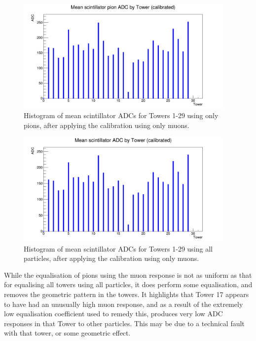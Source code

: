 \begin{figure}[h]
	\centering
	\includegraphics[width=0.95\textwidth]{../Pictures/IDEA/Calibration/towerplot-scintillator-mean-muoncalibrated-pions.png}
	\caption{Histogram of mean scintillator \acrshort{ADC}s for Towers 1-29 using only pions, after applying the calibration using only muons.}
	\label{figure:testbeam/results/towerplot-mean-muoncalibrated-pions}
\end{figure}

\begin{figure}[h]
	\centering
	\includegraphics[width=0.95\textwidth]{../Pictures/IDEA/Calibration/towerplot-scintillator-mean-muoncalibrated-all.png}
	\caption{Histogram of mean scintillator \acrshort{ADC}s for Towers 1-29 using all particles, after applying the calibration using only muons.}
	\label{figure:testbeam/results/towerplot-mean-muoncalibrated-all}
\end{figure}

While the equalisation of pions using the muon response is not as uniform as that for equalising all towers using all particles, it does perform some equalisation, and removes the geometric pattern in the towers. It highlights that Tower 17 appears to have had an unusually high muon response, and as a result of the extremely low equalisation coefficient used to remedy this, produces very low \acrshort{ADC} responses in that Tower to other particles. This may be due to a technical fault with that tower, or some geometric effect.

